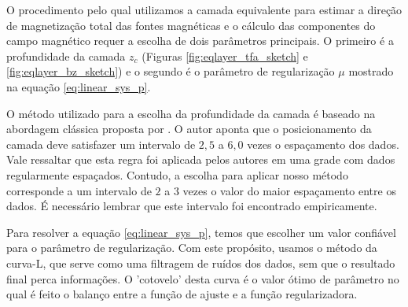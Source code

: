 O procedimento pelo qual utilizamos a camada equivalente para estimar a direção de magnetização total das fontes magnéticas e o cálculo das componentes do campo magnético requer a escolha de dois parâmetros principais. O primeiro é a profundidade da camada $z_c$ (Figuras \ref{fig:eqlayer_tfa_sketch} e \ref{fig:eqlayer_bz_sketch}) e o segundo é o parâmetro de regularização $\mu$ mostrado na equação \ref{eq:linear_sys_p}. 

O método utilizado para a escolha da profundidade da camada é baseado na abordagem clássica proposta por \cite{dampney1969}. O autor aponta que o posicionamento da camada deve satisfazer um intervalo de $2,5$ a $6,0$ vezes o espaçamento dos dados. Vale ressaltar que esta regra foi aplicada pelos autores em uma grade com dados regularmente espaçados. Contudo, a escolha para aplicar nosso método corresponde a um intervalo de $2$ a $3$ vezes o valor do maior espaçamento entre os dados. É necessário lembrar que este intervalo foi encontrado empiricamente. 

Para resolver a equação \ref{eq:linear_sys_p}, temos que escolher um valor confiável para o parâmetro de regularização. Com este propósito, usamos o método da curva-L, que serve como uma filtragem de ruídos dos dados, sem que o resultado final perca informações. O 'cotovelo' desta curva é o valor ótimo de parâmetro no qual é feito o balanço entre a função de ajuste e a função regularizadora. 

